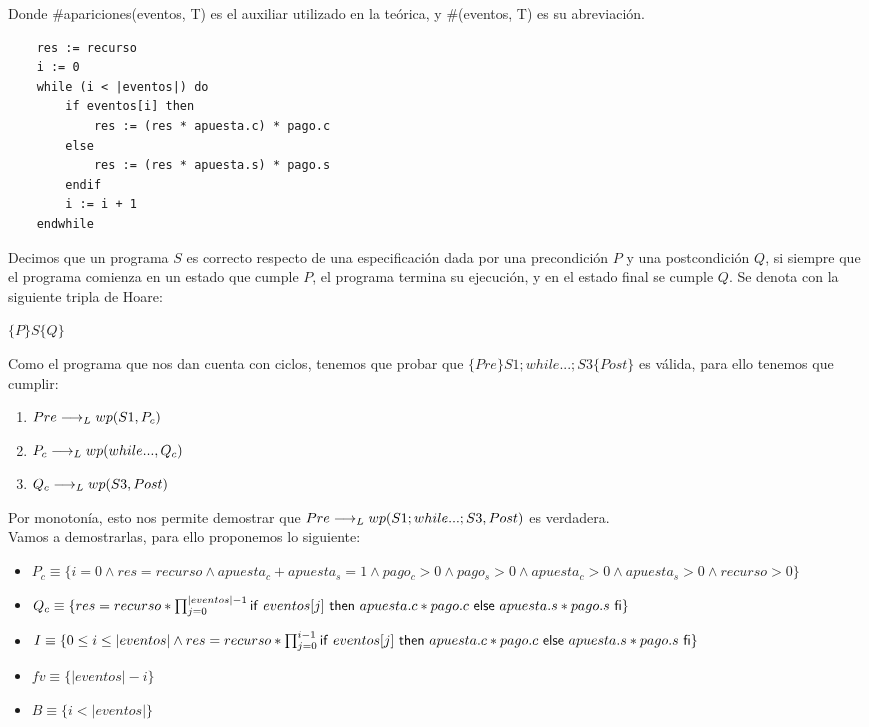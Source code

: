 \documentclass[10pt,a4paper]{article}
\begin{document}
Donde \#apariciones(eventos, T) es el auxiliar utilizado en la teórica, y \#(eventos, T) es su abreviación.
\begin{lstlisting}
	res := recurso
	i := 0
	while (i < |eventos|) do
		if eventos[i] then
			res := (res * apuesta.c) * pago.c
		else
			res := (res * apuesta.s) * pago.s
		endif
		i := i + 1
	endwhile
	\end{lstlisting}
Decimos que un programa $S$ es correcto respecto de una especificación dada por una precondición $P$ y una postcondición $Q$, si siempre que el programa comienza en un estado que cumple $P$, el programa termina su ejecución, y en el estado final se cumple $Q$. Se denota con la siguiente tripla de Hoare: \\
\begin{center}
	$\{P\} S \{Q\}$
\end{center}
Como el programa que nos dan cuenta con ciclos, tenemos que probar que $\{Pre\}S1;while...;S3\{Post\}$ es válida, para ello tenemos que cumplir:
\begin{enumerate}
	\item $Pre \longrightarrow _L wp(S1, P_c)$
	\item $P_c \longrightarrow _L wp(while..., Q_c)$
	\item $Q_c \longrightarrow _L wp(S3, Post)$
\end{enumerate}
Por monotonía, esto nos permite demostrar que $Pre \longrightarrow _L wp(S1;while...;S3, Post)$ es verdadera. \\
Vamos a demostrarlas, para ello proponemos lo siguiente:
\begin{itemize}
	\item $P_c \equiv \{i = 0 \land res = recurso \land apuesta_c + apuesta_s = 1 \land pago_c > 0 \land pago_s > 0 \land apuesta_c > 0 \land apuesta_s > 0 \land recurso > 0\}$
	\item $Q_c \equiv \{res = recurso * \prod_{j = 0}^{|eventos| - 1} \mathsf{if}\ eventos[j]\ \mathsf{then}\ apuesta.c *pago.c\ \mathsf{else}\ apuesta.s * pago.s\ \mathsf{fi}\}$
	\item $I \equiv \{0 \leq i \leq |eventos| \land res = recurso * \prod_{j = 0}^{i - 1} \mathsf{if}\ eventos[j]\ \mathsf{then}\ apuesta.c *pago.c\ \mathsf{else}\ apuesta.s * pago.s\ \mathsf{fi}\}$
	\item $fv \equiv \{|eventos|-i \}$
	\item $B \equiv \{i < |eventos|\}$
\end{itemize}
\end{document}
